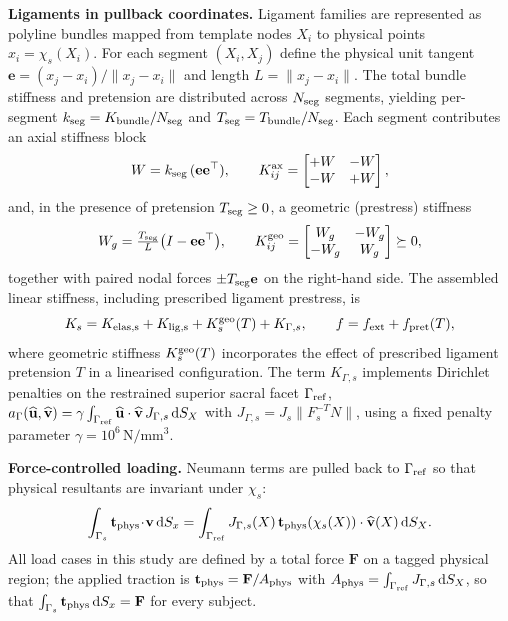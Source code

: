 \documentclass[pdflatex,sn-basic]{sn-jnl}
\begin{document}
\noindent\textbf{Ligaments in pullback coordinates.}
Ligament families are represented as polyline bundles mapped from template nodes $X_i$ to physical points $x_i=\chi_s(X_i)$.
For each segment $(X_i,X_j)$ define the physical unit tangent $\mathbf e=(x_j-x_i)/\|x_j-x_i\|$ and length $L=\|x_j-x_i\|$.
The total bundle stiffness and pretension are distributed across $N_{\rm seg}$ segments, yielding per-segment $k_{\rm seg}=K_{\rm bundle}/N_{\rm seg}$ and $T_{\rm seg}=T_{\rm bundle}/N_{\rm seg}$.
Each segment contributes an axial stiffness block
\begin{equation}
W=k_{\rm seg}\,(\mathbf e\mathbf e^\top),\qquad
K^{\rm ax}_{ij}=\begin{bmatrix} +W & -W\\ -W & +W\end{bmatrix},
\end{equation}
and, in the presence of pretension $T_{\rm seg}\ge 0$, a geometric (prestress) stiffness
\begin{equation}
W_g=\tfrac{T_{\rm seg}}{L}\big(I-\mathbf e\mathbf e^\top\big),\qquad K^{\rm geo}_{ij}=\begin{bmatrix}W_g&-W_g\\-W_g&W_g\end{bmatrix}\succeq0,
\label{eq:kgeo}
\end{equation}
together with paired nodal forces $\pm T_{\rm seg}\mathbf e$ on the right-hand side.
The assembled linear stiffness, including prescribed ligament prestress, is
\begin{equation}
K_s=K_{\rm elas,s}+K_{\rm lig,s}+K^{\rm geo}_s(T)+K_{\Gamma,s},\qquad
f=f_{\rm ext}+f_{\rm pret}(T),
\label{eq:K-assembled}
\end{equation}
where geometric stiffness $K^{\rm geo}_s(T)$ incorporates the effect of prescribed ligament pretension $T$ in a linearised configuration.
The term $K_{\Gamma,s}$ implements Dirichlet penalties on the restrained superior sacral facet $\Gamma_{\rm ref}$,
$a_\Gamma(\widehat{\mathbf u},\widehat{\mathbf v})=\gamma\int_{\Gamma_{\rm ref}} \widehat{\mathbf u}\cdot\widehat{\mathbf v}\,J_{\Gamma,s}\,\mathrm dS_X$ with $J_{\Gamma,s}=J_s\|F_s^{-T}N\|$, using a fixed penalty parameter $\gamma = 10^6\,\mathrm{N/mm^3}$.

\noindent\textbf{Force-controlled loading.}
Neumann terms are pulled back to $\Gamma_{\rm ref}$ so that physical resultants are invariant under $\chi_s$:
\begin{equation}
\int_{\Gamma_s}\mathbf t_{\rm phys}\!\cdot\!\mathbf v\,\mathrm dS_x
=\int_{\Gamma_{\rm ref}} J_{\Gamma,s}(X)\,\mathbf t_{\rm phys}(\chi_s(X))\cdot\widehat{\mathbf v}(X)\,\mathrm dS_X.
\label{eq:neumann-pullback}
\end{equation}
All load cases in this study are defined by a total force $\mathbf F$ on a tagged physical region; the applied traction is $\mathbf t_{\rm phys}=\mathbf F/A_{\rm phys}$ with $A_{\rm phys}=\int_{\Gamma_{\rm ref}}J_{\Gamma,s}\,\mathrm dS_X$, so that $\int_{\Gamma_s}\mathbf t_{\rm phys}\,\mathrm dS_x=\mathbf F$ for every subject.
\end{document}
